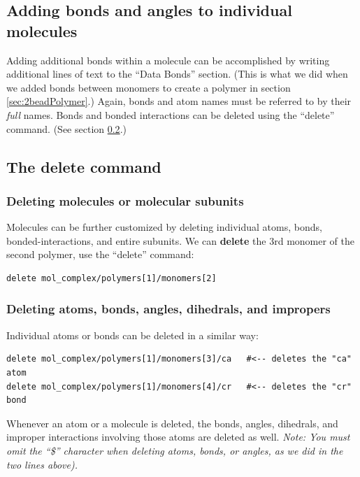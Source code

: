 \documentclass[11pt]{article}
\begin{document}
\subsection{Adding bonds and angles to individual molecules}
\label{sec:adding_atoms_bonds}
Adding additional bonds within a molecule can be accomplished
by writing additional lines of text to the ``Data Bonds'' section.
(This is what we did when we added bonds between monomers to create a polymer
 in section \ref{sec:2beadPolymer}.)
Again, bonds and atom names must be referred to by their \textit{full} names.
Bonds and bonded interactions can be deleted using the ``delete'' command.
(See section \ref{sec:delete}.)


\subsection{The \textbf{delete} command}
\label{sec:delete}

\subsubsection{Deleting molecules or molecular subunits}
Molecules can be further customized by deleting 
individual atoms, bonds, bonded-interactions, and entire subunits.
We can \textbf{delete} the 3rd monomer of the second polymer, 
use the ``delete'' command:
\begin{verbatim}
delete mol_complex/polymers[1]/monomers[2]
\end{verbatim}

\subsubsection{Deleting atoms, bonds, angles, dihedrals, and impropers}
\label{sec:delete_atoms_bonds}
Individual atoms or bonds can be deleted in a similar way:
\begin{verbatim}
delete mol_complex/polymers[1]/monomers[3]/ca   #<-- deletes the "ca" atom
delete mol_complex/polymers[1]/monomers[4]/cr   #<-- deletes the "cr" bond
\end{verbatim}
Whenever an atom or a molecule is deleted, the bonds, angles, dihedrals, 
and improper interactions involving those atoms are deleted as well.
\textit{Note: You must omit the ``\$'' character when deleting atoms,
bonds, or angles, as we did in the two lines above).}


\end{document}
